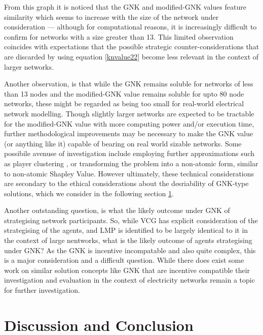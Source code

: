 From this graph it is noticed that the GNK and modified-GNK values feature similarity which seems to increase with the size of the network under consideration --- although for computational reasons, it is increasingly difficult to confirm for networks with a size greater than 13.
This limited observation coincides with expectations that the possible strategic counter-considerations that are discarded by using equation \ref{knvalue22} become less relevant in the context of larger networks.

Another observation, is that while the GNK remains soluble for networks of less than 13 nodes and the modified-GNK value remains soluble for upto 80 node networks, these might be regarded as being too small for real-world electrical network modelling.
Though slightly larger networks are expected to be tractable for the modified-GNK value with more computing power and/or execution time, further methodological improvements may be necessary to make the GNK value (or anything like it) capable of bearing on real world sizable networks.
Some possibile avenuse of investigation include employing further approximations such as player clustering \cite{DBLP:journals/corr/abs-1903-10965}, or transforming the problem into a non-atomic form, similar to non-atomic Shapley Value.
However ultimately, these technical considerations are secondary to the ethical considerations about the desriability of GNK-type solutions, which we consider in the following section \ref{sec:GNK_value_discussion}.

Another outstanding question, is what the likely outcome under GNK of strategising network participants.
So, while VCG has explicit consideration of the strategising of the agents, and LMP is identified to be largely identical to it in the context of large nentworks, what is the likely outcome of agents strategising under GNK?
As the GNK is incentive incompatable and also quite complex, this is a major consideration and a difficult question.
While there does exist some work on similar solution concepts like GNK that are incentive compatible \cite{myerson1,Salamanca2019} their investigation and evaluation in the context of electricity networks remain a topic for further investigation.





\section{Discussion and Conclusion}\label{sec:GNK_value_discussion}

